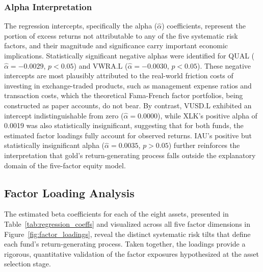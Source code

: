 \documentclass[12pt]{article}
\begin{document}
\subsubsection{Alpha Interpretation}

The regression intercepts, specifically the alpha ($\hat{\alpha}$) coefficients, represent the portion of excess returns not attributable to any of the five systematic risk factors, and their magnitude and significance carry important economic implications. 
 Statistically significant negative alphas were identified for QUAL ($\hat{\alpha} = -0.0029$, $p < 0.05$) and VWRA.L ($\hat{\alpha} = -0.0030$, $p < 0.05$). These negative intercepts are most plausibly attributed to the real-world friction costs of investing in exchange-traded products, such as management expense ratios and transaction costs, which the theoretical Fama-French factor portfolios, being constructed as paper accounts, do not bear.  By contrast, VUSD.L exhibited an intercept indistinguishable from zero ($\hat{\alpha} = 0.0000$), while XLK's positive alpha of 0.0019 was also statistically insignificant, suggesting that for both funds, the estimated factor loadings fully account for observed returns. IAU's positive but statistically insignificant alpha ($\hat{\alpha} = 0.0035$, $p > 0.05$) further reinforces the interpretation that gold's return-generating process falls outside the explanatory domain of the five-factor equity model.

\subsection{Factor Loading Analysis}

The estimated beta coefficients for each of the eight assets, presented in Table~\ref{tab:regression_coeffs} and visualized across all five factor dimensions in Figure~\ref{fig:factor_loadings}, reveal the distinct systematic risk tilts that define each fund's return-generating process. Taken together, the loadings provide a rigorous, quantitative validation of the factor exposures hypothesized at the asset selection stage.
\end{document}
